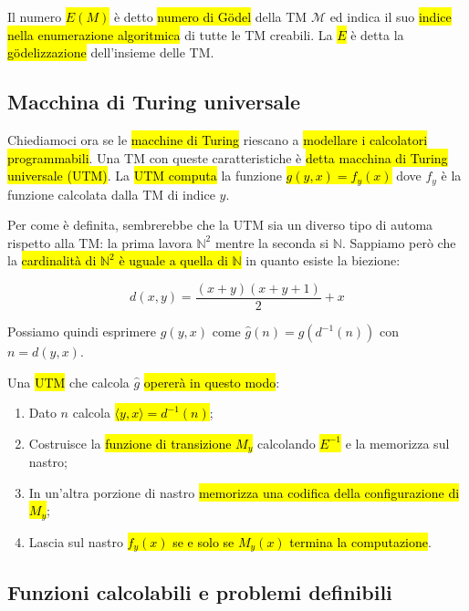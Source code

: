 \documentclass[a4paper,11pt,twoside]{article}
\theoremstyle{plain}
\theoremstyle{definition}
\theoremstyle{remark}
\begin{document}
Il numero \hl{$E(M)$} è detto \hl{numero di Gödel} della TM $\mathcal{M}$ ed
indica il suo \hl{indice nella enumerazione algoritmica} di tutte le TM
creabili. La \hl{$E$} è detta la \hl{gödelizzazione} dell'insieme delle TM\@.

\subsection{Macchina di Turing universale}\label{sec:utm}

Chiediamoci ora se le \hl{macchine di Turing} riescano a \hl{modellare i
calcolatori programmabili}. Una TM con queste caratteristiche è \hl{detta
macchina di Turing universale (UTM)}. La \hl{UTM computa} la funzione
\hl{$g(y,x) = f_y(x)$} dove $f_y$ è la funzione calcolata dalla TM di indice
$y$.

Per come è definita, sembrerebbe che la UTM sia un diverso tipo di automa
rispetto alla TM\@: la prima lavora $\mathbb{N}^2$ mentre la seconda si
$\mathbb{N}$. Sappiamo però che la \hl{cardinalità di $\mathbb{N}^2$ è uguale a
quella di $\mathbb{N}$} in quanto esiste la biezione:

\begin{equation}
  d(x,y) = \frac{(x+y)(x+y+1)}{2} + x
\end{equation}

Possiamo quindi esprimere $g(y,x)$ come $\hat{g}(n) = g(d^{-1}(n))$ con $n =
d(y,x)$.

Una \hl{UTM} che calcola $\hat{g}$ \hl{opererà in questo modo}:

\begin{enumerate}
  \item Dato $n$ calcola \hl{$\langle y,x \rangle = d^{-1}(n)$};
  \item Costruisce la \hl{funzione di transizione $M_y$} calcolando
    \hl{$E^{-1}$} e la memorizza sul nastro;
  \item In un'altra porzione di nastro \hl{memorizza una codifica della
    configurazione di $M_y$};
  \item Lascia sul nastro \hl{$f_y(x)$ se e solo se $M_y(x)$ termina la
    computazione}.
\end{enumerate}

\subsection{Funzioni calcolabili e problemi definibili}\label{sec:func-calc}
\end{document}
